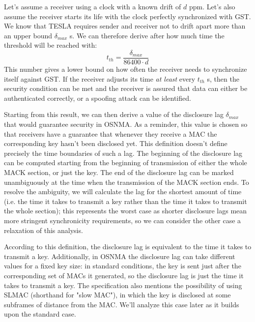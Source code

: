 \vspace{\baselineskip}

Let's assume a receiver using a clock with a known drift of $d$ \si{ppm}. Let's
also assume the receiver starts its life with the clock perfectly synchronized
with GST. We know that TESLA requires sender and receiver not to drift apart
more than an upper bound $\delta_{max}$ \si{s}. We can therefore derive after how much
time the threshold will be reached with:
\begin{equation}
  \label{eq:drift_threshold}
  t_{th} = \frac{\delta_{max}}{86400 \cdot d}
\end{equation}
This number gives a lower bound on how often the receiver needs to synchronize
itself against GST. If the receiver adjusts its time \textit{at least} every
$t_{th}$ \si{s}, then the security condition can be met and the receiver is
assured that data can either be authenticated correctly, or a spoofing attack
can be identified.

Starting from this result, we can then derive a value of the disclosure lag
$\delta_{max}$ that would guarantee security in OSNMA. As a reminder, this value
is chosen so that receivers have a guarantee that whenever they receive a MAC
the corresponding key hasn't been disclosed yet. This definition doesn't define
precisely the time boundaries of such a lag. The beginning of the disclosure lag
can be computed starting from the beginning of transmission of either the whole
MACK section, or just the key. The end of the disclosure lag can be marked
unambiguously at the time when the transmission of the MACK section ends. To
resolve the ambiguity, we will calculate the lag for the shortest amount of time
(i.e. the time it takes to transmit a key rather than the time it takes to
transmit the whole section); this represents the worst case as shorter
disclosure lags mean more stringent synchronicity requirements, so we can
consider the other case a relaxation of this analysis.

According to this definition, the disclosure lag is equivalent to the time it
takes to transmit a key. Additionally, in OSNMA the disclosure lag can take
different values for a fixed key size: in standard conditions, the key is sent
just after the corresponding set of MACs it generated, so the disclosure lag is
just the time it takes to transmit a key. The specification also mentions the
possibility of using SLMAC (shorthand for "slow MAC"), in which the key is
disclosed at some subframes of distance from the MAC. We'll analyze this case
later as it builds upon the standard case.

